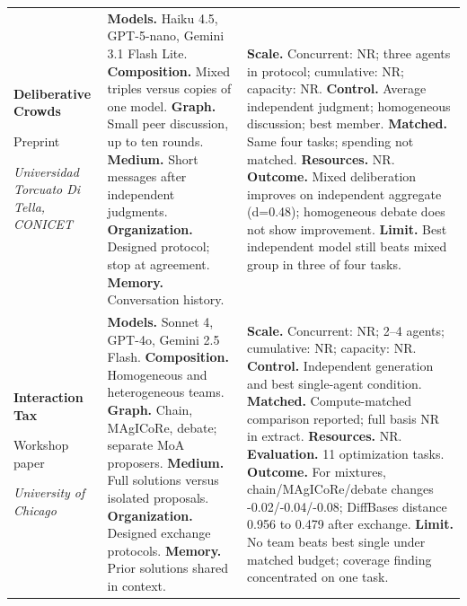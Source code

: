 \begin{longtable}{@{}>{\raggedright\arraybackslash}p{}>{\raggedright\arraybackslash}p{}>{\raggedright\arraybackslash}p{}@{}}
\textbf{Deliberative Crowds}\par \citep{deliberative-crowds}\par Preprint\par\emph{Universidad Torcuato Di Tella, CONICET} & \textbf{Models.} Haiku 4.5, GPT-5-nano, Gemini 3.1 Flash Lite. \textbf{Composition.} Mixed triples versus copies of one model. \textbf{Graph.} Small peer discussion, up to ten rounds. \textbf{Medium.} Short messages after independent judgments. \textbf{Organization.} Designed protocol; stop at agreement. \textbf{Memory.} Conversation history. & \textbf{Scale.} Concurrent: NR; three agents in protocol; cumulative: NR; capacity: NR. \textbf{Control.} Average independent judgment; homogeneous discussion; best member. \textbf{Matched.} Same four tasks; spending not matched. \textbf{Resources.} NR. \textbf{Outcome.} Mixed deliberation improves on independent aggregate (d=0.48); homogeneous debate does not show improvement. \textbf{Limit.} Best independent model still beats mixed group in three of four tasks. \\ \addlinespace[5pt]
\textbf{Interaction Tax}\par \citep{interaction-tax}\par Workshop paper\par\emph{University of Chicago} & \textbf{Models.} Sonnet 4, GPT-4o, Gemini 2.5 Flash. \textbf{Composition.} Homogeneous and heterogeneous teams. \textbf{Graph.} Chain, MAgICoRe, debate; separate MoA proposers. \textbf{Medium.} Full solutions versus isolated proposals. \textbf{Organization.} Designed exchange protocols. \textbf{Memory.} Prior solutions shared in context. & \textbf{Scale.} Concurrent: NR; 2--4 agents; cumulative: NR; capacity: NR. \textbf{Control.} Independent generation and best single-agent condition. \textbf{Matched.} Compute-matched comparison reported; full basis NR in extract. \textbf{Resources.} NR. \textbf{Evaluation.} 11 optimization tasks. \textbf{Outcome.} For mixtures, chain/MAgICoRe/debate changes -0.02/-0.04/-0.08; DiffBases distance 0.956 to 0.479 after exchange. \textbf{Limit.} No team beats best single under matched budget; coverage finding concentrated on one task. \\
\end{longtable}
\endgroup

